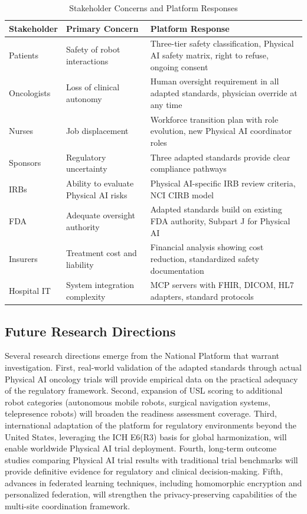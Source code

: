 \begin{table}[H]
\centering
\caption{Stakeholder Concerns and Platform Responses}
\label{tab:stakeholder-concerns}
\small
\begin{tabularx}{\textwidth}{l X X}
\toprule
\textbf{Stakeholder} & \textbf{Primary Concern} & \textbf{Platform Response} \\
\midrule
Patients & Safety of robot interactions & Three-tier safety classification, Physical AI safety matrix, right to refuse, ongoing consent \\
Oncologists & Loss of clinical autonomy & Human oversight requirement in all adapted standards, physician override at any time \\
Nurses & Job displacement & Workforce transition plan with role evolution, new Physical AI coordinator roles \\
Sponsors & Regulatory uncertainty & Three adapted standards provide clear compliance pathways \\
IRBs & Ability to evaluate Physical AI risks & Physical AI-specific IRB review criteria, NCI CIRB model \\
FDA & Adequate oversight authority & Adapted standards build on existing FDA authority, Subpart J for Physical AI \\
Insurers & Treatment cost and liability & Financial analysis showing cost reduction, standardized safety documentation \\
Hospital IT & System integration complexity & MCP servers with FHIR, DICOM, HL7 adapters, standard protocols \\
\bottomrule
\end{tabularx}
\end{table}

\subsection{Future Research Directions}
\label{subsec:discuss-future}

Several research directions emerge from the National Platform that warrant
investigation. First, real-world validation of the adapted standards through
actual Physical AI oncology trials will provide empirical data on the
practical adequacy of the regulatory framework. Second, expansion of USL
scoring to additional robot categories (autonomous mobile robots, surgical
navigation systems, telepresence robots) will broaden the readiness assessment
coverage. Third, international adaptation of the platform for regulatory
environments beyond the United States, leveraging the ICH E6(R3) basis for
global harmonization, will enable worldwide Physical AI trial deployment.
Fourth, long-term outcome studies comparing Physical AI trial results with
traditional trial benchmarks will provide definitive evidence for regulatory
and clinical decision-making. Fifth, advances in federated learning techniques,
including homomorphic encryption and personalized federation, will strengthen
the privacy-preserving capabilities of the multi-site coordination framework.

